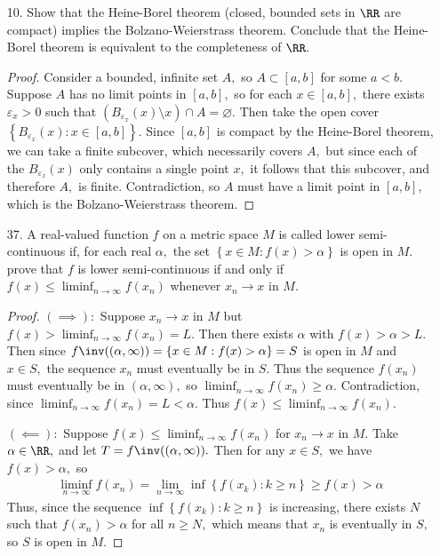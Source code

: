 \documentclass{article}
\begin{document}
\begin{itemize}
	\item[10.] Show that the Heine-Borel theorem (closed, bounded sets in $\RR$ are compact) implies the Bolzano-Weierstrass theorem. Conclude that the Heine-Borel theorem is equivalent to the completeness of $\RR.$
		\begin{proof}
			Consider a bounded, infinite set $A,$ so $A\subset [a, b]$ for some $a<b.$ Suppose $A$ has no limit points in $[a, b],$ so for each $x\in[a, b],$ there exists $\varepsilon_x>0$ such that $\left(B_{\varepsilon_x}(x)\setminus{x}\right)\cap A = \varnothing.$ Then take the open cover $\left\{ B_{\varepsilon_x}(x):x\in [a, b] \right\}.$ Since $[a, b]$ is compact by the Heine-Borel theorem, we can take a finite subcover, which necessarily covers $A,$ but since each of the $B_{\varepsilon_x}(x)$ only contains a single point $x,$ it follows that this subcover, and therefore $A,$ is finite. Contradiction, so $A$ must have a limit point in $[a, b],$ which is the Bolzano-Weierstrass theorem.
		\end{proof}

	\item[37.] A real-valued function $f$ on a metric space $M$ is called lower semi-continuous if, for each real $\alpha,$ the set $\left\{ x\in M:f(x)>\alpha \right\}$ is open in $M.$ prove that $f$ is lower semi-continuous if and only if $f(x)\le \liminf_{n\to\infty} f(x_n)$ whenever $x_n\to x$ in $M.$
		\begin{proof}
			$(\implies):$ Suppose $x_n\to x$ in $M$ but $f(x)>\liminf_{n\to\infty} f(x_n)=L.$ Then there exists $\alpha$ with $f(x)>\alpha>L.$ Then since $f\inv( (\alpha, \infty)) = \left\{ x\in M:f(x)>\alpha \right\}=S$ is open in $M$ and $x\in S,$ the sequence $x_n$ must eventually be in $S.$ Thus the sequence $f(x_n)$ must eventually be in $(\alpha, \infty),$ so $\liminf_{n\to\infty} f(x_n)\ge \alpha.$ Contradiction, since $\liminf_{n\to\infty}f(x_n)=L<\alpha.$ Thus $f(x)\le \liminf_{n\to\infty} f(x_n).$

			$(\impliedby):$ Suppose $f(x)\le \liminf_{n\to\infty} f(x_n)$ for $x_n\to x$ in $M.$ Take $\alpha\in\RR,$ and let $T=f\inv( (\alpha, \infty)).$ Then for any $x\in S,$ we have $f(x)>\alpha,$ so 
			\begin{align*}
				\liminf_{n\to\infty} f(x_n)=\lim_{n\to\infty} \inf\left\{ f(x_k): k\ge n \right\}\ge f(x)>\alpha
			\end{align*}
			Thus, since the sequence $\inf\left\{ f(x_k):k\ge n \right\}$ is increasing, there exists $N$ such that $f(x_n)>\alpha$ for all $n\ge N,$ which means that $x_n$ is eventually in $S,$ so $S$ is open in $M.$
		\end{proof}


\end{itemize}
\end{document}
